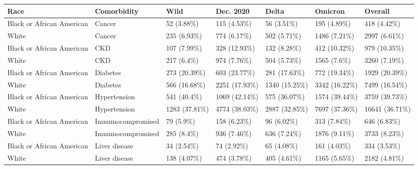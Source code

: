 \begin{table}[ht]
\centering
\begin{tabular}{lllllll}
  \hline
Race & Comorbidity & Wild & Dec. 2020 & Delta & Omicron & Overall \\ 
  \hline
Black or African American & Cancer & 52 (3.88\%) & 115 (4.53\%) & 56 (3.51\%) & 195 (4.89\%) & 418 (4.42\%) \\ 
  White & Cancer & 235 (6.93\%) & 774 (6.17\%) & 502 (5.71\%) & 1486 (7.21\%) & 2997 (6.61\%) \\ 
  Black or African American & CKD & 107 (7.99\%) & 328 (12.93\%) & 132 (8.28\%) & 412 (10.32\%) & 979 (10.35\%) \\ 
  White & CKD & 217 (6.4\%) & 974 (7.76\%) & 504 (5.73\%) & 1565 (7.6\%) & 3260 (7.19\%) \\ 
  Black or African American & Diabetes & 273 (20.39\%) & 603 (23.77\%) & 281 (17.63\%) & 772 (19.34\%) & 1929 (20.39\%) \\ 
  White & Diabetes & 566 (16.68\%) & 2251 (17.93\%) & 1340 (15.25\%) & 3342 (16.22\%) & 7499 (16.54\%) \\ 
  Black or African American & Hypertension & 541 (40.4\%) & 1069 (42.14\%) & 575 (36.07\%) & 1574 (39.44\%) & 3759 (39.73\%) \\ 
  White & Hypertension & 1283 (37.81\%) & 4774 (38.03\%) & 2887 (32.85\%) & 7697 (37.36\%) & 16641 (36.71\%) \\ 
  Black or African American & Immunocompromised & 79 (5.9\%) & 158 (6.23\%) & 96 (6.02\%) & 313 (7.84\%) & 646 (6.83\%) \\ 
  White & Immunocompromised & 285 (8.4\%) & 936 (7.46\%) & 636 (7.24\%) & 1876 (9.11\%) & 3733 (8.23\%) \\ 
  Black or African American & Liver disease & 34 (2.54\%) & 74 (2.92\%) & 65 (4.08\%) & 161 (4.03\%) & 334 (3.53\%) \\ 
  White & Liver disease & 138 (4.07\%) & 474 (3.78\%) & 405 (4.61\%) & 1165 (5.65\%) & 2182 (4.81\%) \\ 
   \hline
\end{tabular}
\end{table}

